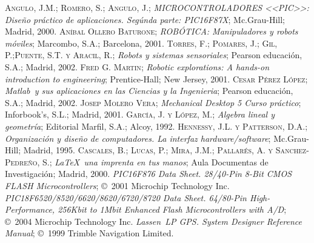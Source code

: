 
\begin{thebibliography}{00}
	  \textsc{Angulo, J.M.; Romero, S.; Angulo, J.}; \emph{MICROCONTROLADORES <<PIC>>: Diseño práctico de aplicaciones. Segúnda parte: PIC16F87X}; Mc.Grau-Hill; Madrid, 2000.
	  \textsc{Aníbal Ollero Baturone}; \emph{ROBÓTICA: Manipuladores y robots móviles}; Marcombo, S.A.; Barcelona, 2001.
	  \textsc{Torres, F.; Pomares, J.; Gil, P.;Puente, S.T. y Aracil, R.}; \emph{Robots y sistemas sensoriales}; Pearson educación, S.A.; Madrid, 2002.
	  \textsc{Fred G. Martin}; \emph{Robotic explorations: A hands-on introduction to engineering}; Prentice-Hall; New Jersey, 2001.
	  \textsc{Cesar Pérez López}; \emph{Matlab\textregistered\ y sus aplicaciones en las Ciencias y la Ingenieria}; Pearson educación, S.A.; Madrid, 2002.
	  \textsc{Josep Molero Vera}; \emph{Mechanical Desktop 5 Curso práctico}; Inforbook's, S.L.; Madrid, 2001.
	  \textsc{García, J. y López, M.}; \emph{Algebra lineal y geometría}; Editorial Marfil, S.A.; Alcoy, 1992.
	  \textsc{Hennessy, J.L. y Patterson, D.A.}; \emph{Organización y diseño de computadores. La interfaz hardware/software}; Mc.Grau-Hill; Madrid, 1995.
	  \textsc{Cascales, B.; Lucas, P.; Mira, J.M.; Pallarés, A. y Sanchez-Pedreño, S.}; \emph{\LaTeX\ una imprenta en tus manos}; Aula Documentas de Investigación; Madrid, 2000.
	  \emph{PIC16F876 Data Sheet. 28/40-Pin 8-Bit CMOS FLASH Microcontrollers}; \copyright\ 2001 Microchip Technology Inc.
	  \emph{PIC18F6520/8520/6620/8620/6720/8720 Data Sheet. 64/80-Pin High-Performance, 256Kbit to 1Mbit Enhanced Flash Microcontrollers with A/D}; \copyright\ 2004 Microchip Technology Inc.
	  \emph{Lassen\textregistered\ LP GPS. System Designer Reference Manual}; \copyright\ 1999 Trimble Navigation Limited.
\end{thebibliography}
